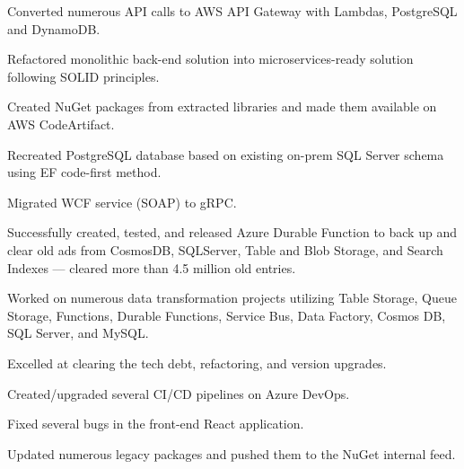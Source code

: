 \documentclass[letterpaper]{cv_12} %
\begin{document}
\begin{newpage}
\begin{minipage}[t]{0.59\textwidth}
    \sectionspace%


    \begin{tightitemize}
        \item Converted numerous API calls to AWS API Gateway with
        Lambdas, PostgreSQL and DynamoDB.\@
        \item Refactored monolithic back-end solution into
        microservices-ready solution following SOLID principles.\@
        \item Created NuGet packages from extracted libraries and made
        them available on AWS CodeArtifact.
        \item Recreated PostgreSQL database based on existing on-prem
        SQL Server schema using EF code-first method.
        \item Migrated WCF service (SOAP) to gRPC.\@
    \end{tightitemize}

    \sectionspace%


    \begin{tightitemize}
        \item Successfully created, tested, and released Azure Durable
        Function to back up and clear old ads from CosmosDB, SQLServer, Table
        and Blob
        Storage, and Search Indexes — cleared more than 4.5 million old
        entries.\@
        \item Worked on numerous data transformation projects utilizing
        Table Storage, Queue Storage, Functions, Durable Functions, Service
        Bus, Data
        Factory, Cosmos DB, SQL Server, and MySQL.\@
        \item Excelled at clearing the tech debt, refactoring, and
        version upgrades.
        \item Created/upgraded several CI/CD pipelines on Azure DevOps.
        \item Fixed several bugs in the front-end React application.
        \item Updated numerous legacy packages and pushed them to the 
        NuGet internal feed.
    \end{tightitemize}

    \sectionspace%


\end{minipage}%

\end{newpage}%
\end{document}
